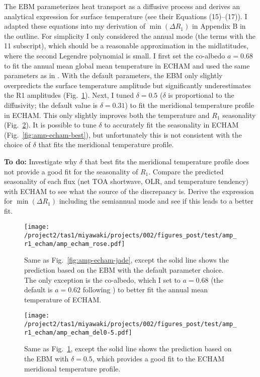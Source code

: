 \documentclass{article}
\begin{document}
The \cite{rose2017} EBM parameterizes heat transport as a diffusive process and derives an analytical expression for surface temperature (see their Equations (15)--(17)). I adapted these equations into my derivation of $\min(\Delta R_1)$ in Appendix B in the outline. For simplicity I only considered the annual mode (the terms with the 11 subscript), which should be a reasonable approximation in the midlatitudes, where the second Legendre polynomial is small. I first set the co-albedo $a=0.68$ to fit the annual mean global mean temperature in ECHAM and used the same parameters as in \cite{rose2017}. With the default parameters, the EBM only slightly overpredicts the surface temperature amplitude but significantly underestimates the R1 amplitudes (Fig.~\ref{fig:amp-echam-rose}). Next, I tuned $\delta=0.5$ ($\delta$ is proportional to the diffusivity; the default value is $\delta=0.31$) to fit the meridional temperature profile in ECHAM. This only slightly improves both the temperature and $R_1$ seasonality (Fig.~\ref{fig:amp-echam-del0-5}). It is possible to tune $\delta$ to accurately fit the seasonality in ECHAM (Fig.~\ref{fig:amp-echam-best}), but unfortunately this is not consistent with the choice of $\delta$ that fits the meridional temperature profile.

\textbf{To do:} Investigate why $\delta$ that best fits the meridional temperature profile does not provide a good fit for the seasonality of $R_1$. Compare the predicted seasonality of each flux (net TOA shortwave, OLR, and temperature tendency) with ECHAM to see what the source of the discrepancy is. Derive the expression for $\min(\Delta R_1)$ including the semiannual mode and see if this leads to a better fit.

\begin{figure}
    \texttt{[image: /project2/tas1/miyawaki/projects/002/figures\_post/test/amp\_r1\_echam/amp\_echam\_rose.pdf]}
    \caption{Same as Fig.~\ref{fig:amp-echam-jade}, except the solid line shows the prediction based on the \cite{rose2017} EBM with the default parameter choice. The only exception is the co-albedo, which I set to $a=0.68$ (the default is $a=0.62$ following \cite{north1975}) to better fit the annual mean temperature of ECHAM.}
    \label{fig:amp-echam-rose}
\end{figure}

\begin{figure}
    \texttt{[image: /project2/tas1/miyawaki/projects/002/figures\_post/test/amp\_r1\_echam/amp\_echam\_del0-5.pdf]}
    \caption{Same as Fig.~\ref{fig:amp-echam-rose}, except the solid line shows the prediction based on the \cite{rose2017} EBM with $\delta=0.5$, which provides a good fit to the ECHAM meridional temperature profile.}
    \label{fig:amp-echam-del0-5}
\end{figure}
\end{document}
